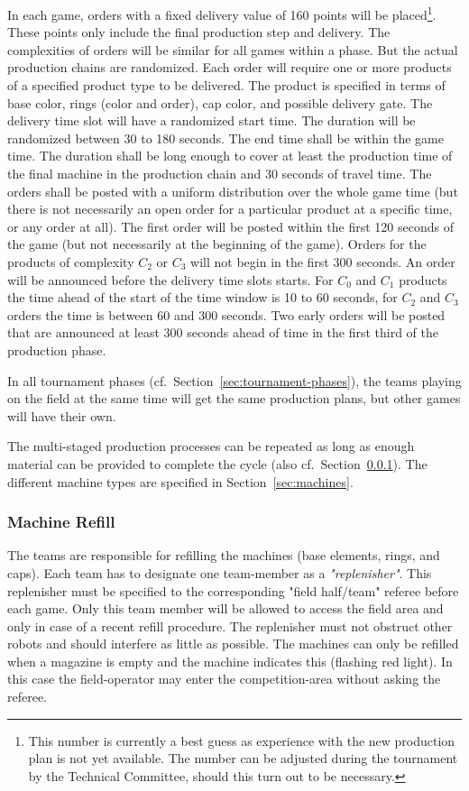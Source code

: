 \documentclass[12pt,twoside]{article}
\newcommand{\refsec}[1]{Section~\ref{#1}}
\begin{document}
In each game, orders with a fixed delivery value of 160 points will be
placed\footnote{This number is currently a best guess as experience
  with the new production plan is not yet available. The number can be
  adjusted during the tournament by the Technical Committee, should
  this turn out to be necessary.}. These points only include the final
production step and delivery. The complexities of orders will be
similar for all games within a phase. But the actual production chains
are randomized. Each order will require one or more products of a
specified product type to be delivered. The product is specified in
terms of base color, rings (color and order), cap color, and possible
delivery gate. The delivery time slot will have a randomized start
time. The duration will be randomized between 30 to 180 seconds. The
end time shall be within the game time. The duration shall be long
enough to cover at least the production time of the final machine in
the production chain and 30 seconds of travel time. The orders shall
be posted with a uniform distribution over the whole game time (but
there is not necessarily an open order for a particular product at a
specific time, or any order at all). The first order will be posted
within the first 120 seconds of the game (but not necessarily at the
beginning of the game). Orders for the products of complexity $C_2$ or
$C_3$ will not begin in the first 300 seconds. An order will be
announced before the delivery time slots starts. For $C_0$ and $C_1$
products the time ahead of the start of the time window is 10 to 60
seconds, for $C_2$ and $C_3$ orders the time is between 60 and 300
seconds. Two early orders will be posted that are announced at least
300 seconds ahead of time in the first third of the production phase.

In all tournament phases (cf.~\refsec{sec:tournament-phases}), the
teams playing on the field at the same time will get the same
production plans, but other games will have their own.

The multi-staged production processes can be repeated as long as
enough material can be provided to complete the cycle (also
cf.~\refsec{sec:machine-refill}). The different machine types are
specified in Section~\ref{sec:machines}.

\subsubsection{Machine Refill}
\label{sec:machine-refill}
The teams are responsible for refilling the machines (base elements,
rings, and caps). Each team has to designate one team-member as a
\textit{"replenisher"}.  This replenisher must be specified to the
corresponding "field half/team" referee before each game.  Only this
team member will be allowed to access the field area and only in case
of a recent refill procedure.  The replenisher must not obstruct other
robots and should interfere as little as possible.  The machines can
only be refilled when a magazine is empty and the machine indicates
this (flashing red light). In this case the field-operator may enter
the competition-area without asking the referee.
\end{document}
